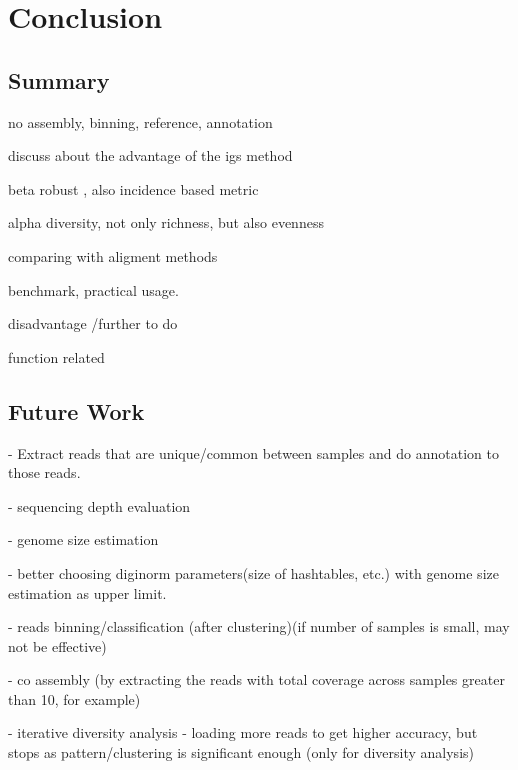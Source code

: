 \documentclass[12pt]{report}
\begin{document}
\chapter{Conclusion}





\section{Summary}

no assembly, binning, reference, annotation

discuss about the advantage of the igs method

beta robust , also incidence based metric

alpha diversity, not only richness, but also evenness

comparing with aligment methods

benchmark, practical usage.

disadvantage /further to do

function  related

\section{Future Work}

    - Extract reads that are unique/common between samples and do annotation to those reads.
    
    - sequencing depth evaluation
    
    - genome size estimation
    
    - better choosing diginorm parameters(size of hashtables, etc.) with genome size estimation as upper limit. 
    
    - reads binning/classification (after clustering)(if number of samples is small, may not be effective)
    
    - co assembly (by extracting the reads with total coverage across samples greater than 10, for example)
    
    - iterative diversity analysis - loading more reads to get higher accuracy, but  stops as pattern/clustering is significant enough
    (only for diversity analysis)
    



\end{document}
